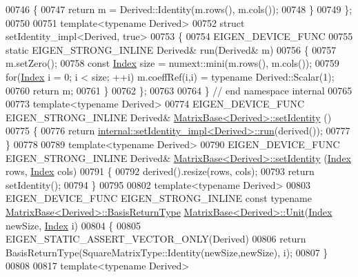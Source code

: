 \begin{DoxyCode}
00746   \{
00747     \textcolor{keywordflow}{return} m = Derived::Identity(m.rows(), m.cols());
00748   \}
00749 \};
00750 
00751 \textcolor{keyword}{template}<\textcolor{keyword}{typename} Derived>
00752 \textcolor{keyword}{struct }setIdentity\_impl<Derived, true>
00753 \{
00754   EIGEN\_DEVICE\_FUNC
00755   \textcolor{keyword}{static} EIGEN\_STRONG\_INLINE Derived& run(Derived& m)
00756   \{
00757     m.setZero();
00758     \textcolor{keyword}{const} \hyperlink{namespace_eigen_a62e77e0933482dafde8fe197d9a2cfde}{Index} size = numext::mini(m.rows(), m.cols());
00759     \textcolor{keywordflow}{for}(\hyperlink{namespace_eigen_a62e77e0933482dafde8fe197d9a2cfde}{Index} i = 0; i < size; ++i) m.coeffRef(i,i) = \textcolor{keyword}{typename} Derived::Scalar(1);
00760     \textcolor{keywordflow}{return} m;
00761   \}
00762 \};
00763 
00764 \} \textcolor{comment}{// end namespace internal}
00765 
00773 \textcolor{keyword}{template}<\textcolor{keyword}{typename} Derived>
00774 EIGEN\_DEVICE\_FUNC EIGEN\_STRONG\_INLINE Derived& \hyperlink{group___core___module_ae05be7fcc1ade707f0b73eb5f9d8cf33}{MatrixBase<Derived>::setIdentity}
      ()
00775 \{
00776   \textcolor{keywordflow}{return} \hyperlink{struct_eigen_1_1internal_1_1set_identity__impl}{internal::setIdentity\_impl<Derived>::run}(derived());
00777 \}
00778 
00789 \textcolor{keyword}{template}<\textcolor{keyword}{typename} Derived>
00790 EIGEN\_DEVICE\_FUNC EIGEN\_STRONG\_INLINE Derived& \hyperlink{group___core___module_ae05be7fcc1ade707f0b73eb5f9d8cf33}{MatrixBase<Derived>::setIdentity}
      (\hyperlink{namespace_eigen_a62e77e0933482dafde8fe197d9a2cfde}{Index} rows, \hyperlink{namespace_eigen_a62e77e0933482dafde8fe197d9a2cfde}{Index} cols)
00791 \{
00792   derived().resize(rows, cols);
00793   \textcolor{keywordflow}{return} setIdentity();
00794 \}
00795 
00802 \textcolor{keyword}{template}<\textcolor{keyword}{typename} Derived>
00803 EIGEN\_DEVICE\_FUNC EIGEN\_STRONG\_INLINE \textcolor{keyword}{const} \textcolor{keyword}{typename} 
      \hyperlink{group___core___module_class_eigen_1_1_block}{MatrixBase<Derived>::BasisReturnType} 
      \hyperlink{group___core___module_a1f39dde25807c1f008aa874e690b3fed}{MatrixBase<Derived>::Unit}(\hyperlink{namespace_eigen_a62e77e0933482dafde8fe197d9a2cfde}{Index} newSize, \hyperlink{namespace_eigen_a62e77e0933482dafde8fe197d9a2cfde}{Index} i)
00804 \{
00805   EIGEN\_STATIC\_ASSERT\_VECTOR\_ONLY(Derived)
00806   \textcolor{keywordflow}{return} BasisReturnType(SquareMatrixType::Identity(newSize,newSize), i);
00807 \}
00808 
00817 \textcolor{keyword}{template}<\textcolor{keyword}{typename} Derived>

\end{DoxyCode}
